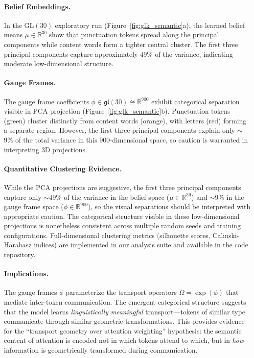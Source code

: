 \documentclass[twoside,11pt]{article}
\begin{document}
\paragraph{Belief Embeddings.} In the $\mathrm{GL}(30)$ exploratory run (Figure~\ref{fig:glk_semantic}a), the learned belief means $\mu \in \mathbb{R}^{30}$ show that punctuation tokens spread along the principal components while content words form a tighter central cluster. The first three principal components capture approximately 49\% of the variance, indicating moderate low-dimensional structure.

\paragraph{Gauge Frames.} The gauge frame coefficients $\phi \in \mathfrak{gl}(30) \cong \mathbb{R}^{900}$ exhibit categorical separation visible in PCA projection (Figure~\ref{fig:glk_semantic}b). Punctuation tokens (green) cluster distinctly from content words (orange), with letters (red) forming a separate region. However, the first three principal components explain only $\sim$9\% of the total variance in this 900-dimensional space, so caution is warranted in interpreting 3D projections.

\paragraph{Quantitative Clustering Evidence.} While the PCA projections are suggestive, the first three principal components capture only $\sim$49\% of the variance in the belief space ($\mu \in \mathbb{R}^{30}$) and $\sim$9\% in the gauge frame space ($\phi \in \mathbb{R}^{900}$), so the visual separations should be interpreted with appropriate caution. The categorical structure visible in these low-dimensional projections is nonetheless consistent across multiple random seeds and training configurations. Full-dimensional clustering metrics (silhouette scores, Calinski-Harabasz indices) are implemented in our analysis suite and available in the code repository.

\paragraph{Implications.} The gauge frames $\phi$ parameterize the transport operators $\Omega = \exp(\phi)$ that mediate inter-token communication. The emergent categorical structure suggests that the model learns \emph{linguistically meaningful} transport---tokens of similar type communicate through similar geometric transformations. This provides evidence for the ``transport geometry over attention weighting'' hypothesis: the semantic content of attention is encoded not in which tokens attend to which, but in \emph{how} information is geometrically transformed during communication.
\end{document}

